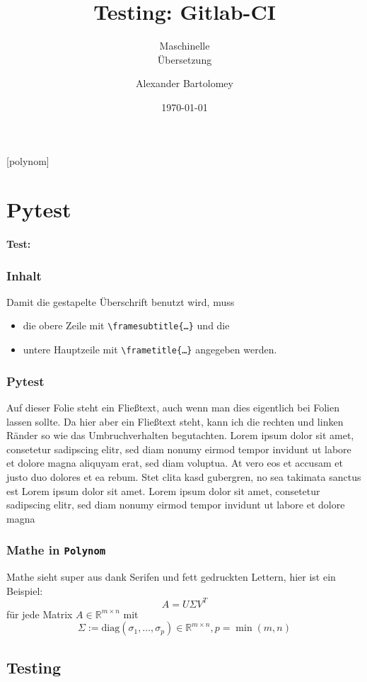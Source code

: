 \documentclass[t]{beamer}
\title{Testing: Gitlab-CI}
\subtitle{Maschinelle\\Übersetzung}
\date[Polynom]{\today}
\author{Alexander Bartolomey}
\institute[Polynom]{Polynom Aachen University}
\begin{document}
[polynom]{}

\begin{frame}[plain]
  \titlepage{}
\end{frame}

\section{Pytest}

\begin{frame}
  \framesubtitle{Test:}
  \frametitle{Inhalt}
  Damit die gestapelte Überschrift benutzt wird, muss \begin{itemize}
    \item die obere Zeile mit \texttt{\textbackslash{}framesubtitle\{\ldots \}} und die
    \item untere Hauptzeile mit \texttt{\textbackslash{}frametitle\{\ldots \}} angegeben werden.
  \end{itemize} 
\end{frame}

\begin{frame}
  \frametitle{Pytest}
  Auf dieser Folie steht ein Fließtext, auch wenn man dies eigentlich
  bei Folien lassen sollte.  Da hier aber ein Fließtext steht, kann
  ich die rechten und linken Ränder so wie das Umbruchverhalten begutachten. 
  Lorem ipsum dolor sit amet, consetetur sadipscing elitr, sed diam nonumy eirmod 
  tempor invidunt ut labore et dolore magna aliquyam erat, sed diam voluptua. 
  At vero eos et accusam et justo duo dolores et ea rebum. Stet clita kasd gubergren, 
  no sea takimata sanctus est Lorem ipsum dolor sit amet. Lorem ipsum dolor sit amet, 
  consetetur sadipscing elitr, sed diam nonumy eirmod tempor invidunt ut labore 
  et dolore magna
\end{frame}

\begin{frame}
  \frametitle{Mathe in \texttt{Polynom}}
  Mathe sieht super aus dank Serifen und fett gedruckten Lettern, hier ist ein Beispiel:
  \[A = U\Sigma V^T\]
  für jede Matrix \(A \in \mathbb{R}^{m\times n}\) mit \[\Sigma:=\mathrm{diag}(\sigma_1,\dots,\sigma_p) \in \mathbb{R}^{m\times n}, p = \min(m,n)\]
\end{frame}

\subsection{Testing}
\end{document}
